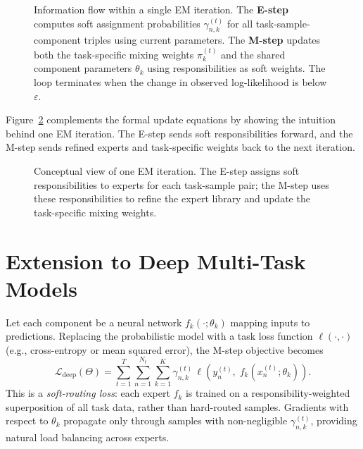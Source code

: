 \documentclass[preprint,12pt]{elsarticle}
\begin{document}
\begin{figure}[t]
		\caption{Information flow within a single EM iteration. The
			\textcolor{red!70}{\textbf{E-step}} computes soft assignment
			probabilities $\gamma_{n,k}^{(t)}$ for all task-sample-component
			triples using current parameters. The
			\textcolor{blue!70}{\textbf{M-step}} updates both the task-specific
			mixing weights $\pi_k^{(t)}$ and the shared component parameters
			$\theta_k$ using responsibilities as soft weights. The loop
			terminates when the change in observed log-likelihood is below
			$\varepsilon$.}
		\label{fig:em_iteration}
	\end{figure}

	Figure~\ref{fig:conceptual_em_loop_png} complements the formal update
	equations by showing the intuition behind one EM iteration. The E-step
	sends soft responsibilities forward, and the M-step sends refined
	experts and task-specific weights back to the next iteration.

	\begin{figure}[t]
		\centering
		\caption{Conceptual view of one EM iteration. The E-step assigns soft
			responsibilities to experts for each task-sample pair; the M-step
			uses these responsibilities to refine the expert library and update
			the task-specific mixing weights.}
		\label{fig:conceptual_em_loop_png}
	\end{figure}
	
	\section{Extension to Deep Multi-Task Models}
	\label{sec:deep}
	
	Let each component be a neural network $f_k(\cdot;\theta_k)$ mapping
	inputs to predictions. Replacing the probabilistic model with a task
	loss function $\ell(\cdot,\cdot)$ (e.g., cross-entropy or mean squared
	error), the M-step objective becomes
	\begin{equation}
		\mathcal{L}_{\mathrm{deep}}(\Theta)
		= \sum_{t=1}^T \sum_{n=1}^{N_t} \sum_{k=1}^K
		\gamma_{n,k}^{(t)}\,
		\ell\!\left(y_n^{(t)},\; f_k\!\left(x_n^{(t)};\theta_k\right)\right).
		\label{eq:deep_loss}
	\end{equation}
	This is a \emph{soft-routing loss}: each expert $f_k$ is trained on a
	responsibility-weighted superposition of all task data, rather than
	hard-routed samples. Gradients with respect to $\theta_k$ propagate
	only through samples with non-negligible $\gamma_{n,k}^{(t)}$,
	providing natural load balancing across experts.
	
\end{document}
